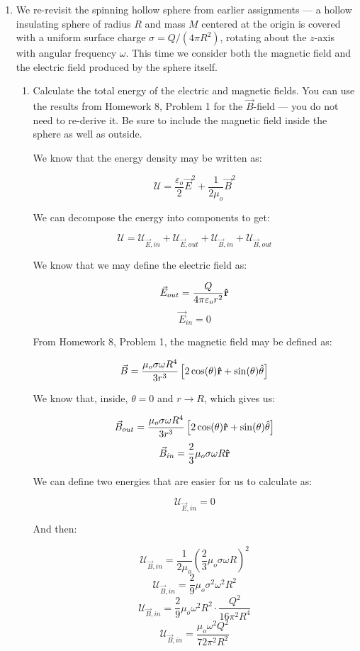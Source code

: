 \begin{enumerate}
  \item We re-revisit the spinning hollow sphere from earlier assignments — a hollow insulating sphere of radius $R$ and mass $M$ centered at the origin is covered with a uniform surface charge $\sigma=Q/(4\pi R^2)$, rotating about the $z$-axis with angular frequency $\omega$. This time we consider both the magnetic field and the electric field produced by the sphere itself.

    \begin{enumerate}

      \item Calculate the total energy of the electric and magnetic fields. You can use the results from Homework 8, Problem 1 for the $\vec{B}$-field — you do not need to re-derive it.  Be sure to include the magnetic field inside the sphere as well as outside.

        We know that the energy density may be written as:

        $$\mathcal{U}=\frac{\varepsilon_o}{2}\vec{E}^2+\frac{1}{2\mu_o}\vec{B}^2$$

        We can decompose the energy into components to get:

        $$\mathcal{U}=\mathcal{U}_{\vec{E},in}+\mathcal{U}_{\vec{E},out}+\mathcal{U}_{\vec{B},in}+\mathcal{U}_{\vec{B},out}$$

        We know that we may define the electric field as:

        $$\vec{E}_{out}=\frac{Q}{4\pi\varepsilon_o r^2}\bold{\hat{r}}$$
        $$\vec{E}_{in}=0$$

        From Homework 8, Problem 1, the magnetic field may be defined as:

        $$\vec{B}=\frac{\mu_o\sigma\omega R^4}{3r^3}\left[ 2\cos(\theta)\bold{\hat{r}}+\sin(\theta)\hat{\theta} \right]$$

        We know that, inside, $\theta=0$ and $r\to R$, which gives us:

        $$\vec{B}_{out}=\frac{\mu_o\sigma\omega R^4}{3r^3}\left[ 2\cos(\theta)\bold{\hat{r}}+\sin(\theta)\hat{\theta} \right]$$
        $$\vec{B}_{in}=\frac{2}{3}\mu_o\sigma\omega R\bold{\hat{r}}$$

        We can define two energies that are easier for us to calculate as:

        $$\mathcal{U}_{\vec{E},in}=0$$

        And then:

        $$\mathcal{U}_{\vec{B},in}=\frac{1}{2\mu_o}\left( \frac{2}{3}\mu_o\sigma\omega R \right)^2$$
        $$\mathcal{U}_{\vec{B},in}=\frac{2}{9}\mu_o\sigma^2\omega^2 R^2$$
        $$\mathcal{U}_{\vec{B},in}=\frac{2}{9}\mu_o\omega^2 R^2\cdot\frac{Q^2}{16\pi^2R^4}$$
        $$\mathcal{U}_{\vec{B},in}=\frac{\mu_o\omega^2Q^2}{72\pi^2R^2}$$


\end{enumerate}
\end{enumerate}
